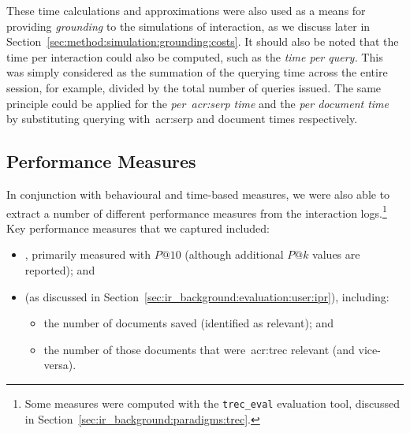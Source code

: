 These time calculations and approximations were also used as a means for providing \emph{grounding} to the simulations of interaction, as we discuss later in Section~\ref{sec:method:simulation:grounding:costs}. It should also be noted that the time per interaction could also be computed, such as the \emph{time per query.} This was simply considered as the summation of the querying time across the entire session, for example, divided by the total number of queries issued. The same principle could be applied for the \emph{per~\gls{acr:serp} time} and the \emph{per document time} by substituting querying with~\gls{acr:serp} and document times respectively.

\subsection{Performance Measures}\label{sec:methodology:extracting:performance}
In conjunction with behavioural and time-based measures, we were also able to extract a number of different performance measures from the interaction logs.\footnote{Some measures were computed with the \texttt{trec\_eval} evaluation tool, discussed in Section~\ref{sec:ir_background:paradigms:trec}.} Key performance measures that we captured included:

\begin{itemize}
    \item{, primarily measured with $P@10$ (although additional $P@k$ values are reported); and}
    \item{ (as discussed in Section~\ref{sec:ir_background:evaluation:user:ipr}), including:}
    
    \begin{itemize}
        \item{the number of documents saved (identified as relevant); and}
        \item{the number of those documents that were~\gls{acr:trec} relevant (and vice-versa).}
    \end{itemize}
\end{itemize}


